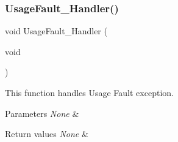 \subsubsection{\texorpdfstring{Usage\+Fault\+\_\+\+Handler()}{UsageFault\_Handler()}}
{\footnotesize\ttfamily void Usage\+Fault\+\_\+\+Handler (\begin{DoxyParamCaption}\item[{void}]{ }\end{DoxyParamCaption})}



This function handles Usage Fault exception. 


\begin{DoxyParams}{Parameters}
{\em None} & \\
\hline
\end{DoxyParams}

\begin{DoxyRetVals}{Return values}
{\em None} & \\
\hline
\end{DoxyRetVals}

